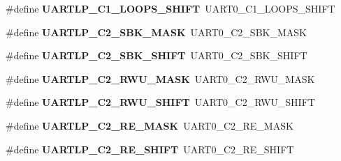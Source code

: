 \begin{DoxyCompactItemize}
\item 
\mbox{\label{group___backward___compatibility___symbols_ga15b68685a3a0931d93b4848953390d10}} 
\#define {\bfseries U\+A\+R\+T\+L\+P\+\_\+\+C1\+\_\+\+L\+O\+O\+P\+S\+\_\+\+S\+H\+I\+FT}~U\+A\+R\+T0\+\_\+\+C1\+\_\+\+L\+O\+O\+P\+S\+\_\+\+S\+H\+I\+FT
\item 
\mbox{\label{group___backward___compatibility___symbols_ga6eae1bd3ccd0ddc022e4b25e685cdcd5}} 
\#define {\bfseries U\+A\+R\+T\+L\+P\+\_\+\+C2\+\_\+\+S\+B\+K\+\_\+\+M\+A\+SK}~U\+A\+R\+T0\+\_\+\+C2\+\_\+\+S\+B\+K\+\_\+\+M\+A\+SK
\item 
\mbox{\label{group___backward___compatibility___symbols_ga7753cf443cbaa9e904cbd69211913709}} 
\#define {\bfseries U\+A\+R\+T\+L\+P\+\_\+\+C2\+\_\+\+S\+B\+K\+\_\+\+S\+H\+I\+FT}~U\+A\+R\+T0\+\_\+\+C2\+\_\+\+S\+B\+K\+\_\+\+S\+H\+I\+FT
\item 
\mbox{\label{group___backward___compatibility___symbols_ga23425daa820ed95ebe0509a11b31712a}} 
\#define {\bfseries U\+A\+R\+T\+L\+P\+\_\+\+C2\+\_\+\+R\+W\+U\+\_\+\+M\+A\+SK}~U\+A\+R\+T0\+\_\+\+C2\+\_\+\+R\+W\+U\+\_\+\+M\+A\+SK
\item 
\mbox{\label{group___backward___compatibility___symbols_ga7e3babc97f1d54f154097c1c3c7f9c13}} 
\#define {\bfseries U\+A\+R\+T\+L\+P\+\_\+\+C2\+\_\+\+R\+W\+U\+\_\+\+S\+H\+I\+FT}~U\+A\+R\+T0\+\_\+\+C2\+\_\+\+R\+W\+U\+\_\+\+S\+H\+I\+FT
\item 
\mbox{\label{group___backward___compatibility___symbols_ga2e5e77f4d10c7c781b36e3d7083daa97}} 
\#define {\bfseries U\+A\+R\+T\+L\+P\+\_\+\+C2\+\_\+\+R\+E\+\_\+\+M\+A\+SK}~U\+A\+R\+T0\+\_\+\+C2\+\_\+\+R\+E\+\_\+\+M\+A\+SK
\item 
\mbox{\label{group___backward___compatibility___symbols_ga7d8e4d4ef51751e7d193373f71e86458}} 
\#define {\bfseries U\+A\+R\+T\+L\+P\+\_\+\+C2\+\_\+\+R\+E\+\_\+\+S\+H\+I\+FT}~U\+A\+R\+T0\+\_\+\+C2\+\_\+\+R\+E\+\_\+\+S\+H\+I\+FT
\item 

\end{DoxyCompactItemize}
